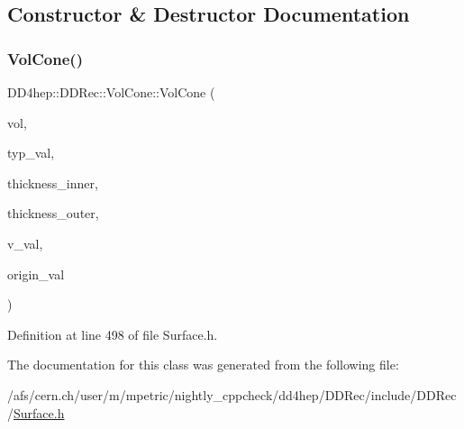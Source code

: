 \subsection{Constructor \& Destructor Documentation}
\hypertarget{class_d_d4hep_1_1_d_d_rec_1_1_vol_cone_a99d5b9981b298e9bbde8929511e157d1}{}\label{class_d_d4hep_1_1_d_d_rec_1_1_vol_cone_a99d5b9981b298e9bbde8929511e157d1} 
\subsubsection{\texorpdfstring{Vol\+Cone()}{VolCone()}}
{\footnotesize\ttfamily D\+D4hep\+::\+D\+D\+Rec\+::\+Vol\+Cone\+::\+Vol\+Cone (\begin{DoxyParamCaption}\item[{\hyperlink{class_d_d4hep_1_1_geometry_1_1_volume}{Geometry\+::\+Volume}}]{vol,  }\item[{\hyperlink{class_d_d_surfaces_1_1_surface_type}{Surface\+Type}}]{typ\+\_\+val,  }\item[{double}]{thickness\+\_\+inner,  }\item[{double}]{thickness\+\_\+outer,  }\item[{\hyperlink{class_d_d_surfaces_1_1_vector3_d}{Vector3D}}]{v\+\_\+val,  }\item[{\hyperlink{class_d_d_surfaces_1_1_vector3_d}{Vector3D}}]{origin\+\_\+val }\end{DoxyParamCaption})\hspace{0.3cm}{\ttfamily [inline]}}



Definition at line 498 of file Surface.\+h.



The documentation for this class was generated from the following file\+:\begin{DoxyCompactItemize}
\item 
/afs/cern.\+ch/user/m/mpetric/nightly\+\_\+cppcheck/dd4hep/\+D\+D\+Rec/include/\+D\+D\+Rec/\hyperlink{_surface_8h}{Surface.\+h}\end{DoxyCompactItemize}
